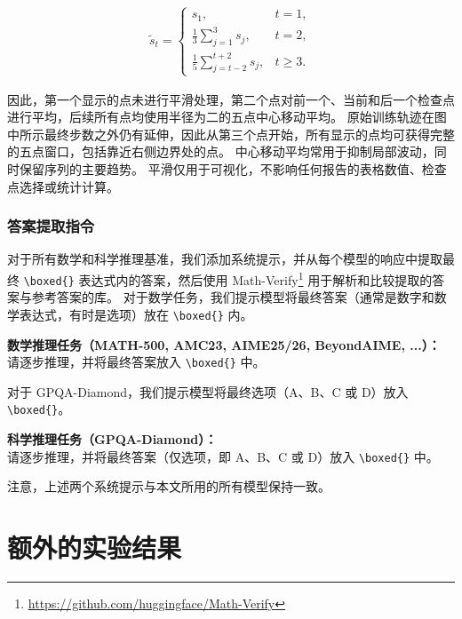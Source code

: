 \begingroup
\begin{align*}
    \widetilde{s}_t
    =
    \begin{cases}
        s_1,
        & t=1, \\[2pt]
        \displaystyle
        \frac{1}{3}\sum_{j=1}^{3}s_j,
        & t=2, \\[8pt]
        \displaystyle
        \frac{1}{5}\sum_{j=t-2}^{t+2}s_j,
        & t\geq 3.
    \end{cases}
\end{align*}
\endgroup

因此，第一个显示的点未进行平滑处理，第二个点对前一个、当前和后一个检查点进行平均，后续所有点均使用半径为二的五点中心移动平均。
原始训练轨迹在图中所示最终步数之外仍有延伸，因此从第三个点开始，所有显示的点均可获得完整的五点窗口，包括靠近右侧边界处的点。
中心移动平均常用于抑制局部波动，同时保留序列的主要趋势\citep{hyndman2018forecasting}。
平滑仅用于可视化，不影响任何报告的表格数值、检查点选择或统计计算。

\subsubsection{答案提取指令}
对于所有数学和科学推理基准，我们添加系统提示，并从每个模型的响应中提取最终 \texttt{\textbackslash boxed\{\}} 表达式内的答案，然后使用 Math-Verify\footnote{\url{https://github.com/huggingface/Math-Verify}} 用于解析和比较提取的答案与参考答案的库。  
对于数学任务，我们提示模型将最终答案（通常是数字和数学表达式，有时是选项）放在 \texttt{\textbackslash boxed\{\}} 内。  
\begin{insightbox}  
\textbf{数学推理任务（MATH-500, AMC23, AIME25/26, BeyondAIME, ...）：}\\  
请逐步推理，并将最终答案放入 \texttt{\textbackslash boxed\{\}} 中。  
\end{insightbox}  
对于 GPQA-Diamond，我们提示模型将最终选项（A、B、C 或 D）放入 \texttt{\textbackslash boxed\{\}}。  
\begin{insightbox}  
\textbf{科学推理任务（GPQA-Diamond）：}\\  
请逐步推理，并将最终答案（仅选项，即 A、B、C 或 D）放入 \texttt{\textbackslash boxed\{\}} 中。  
\end{insightbox}  
注意，上述两个系统提示与本文所用的所有模型保持一致。




\section{额外的实验结果}
\label{sec:appendix_add_results}
